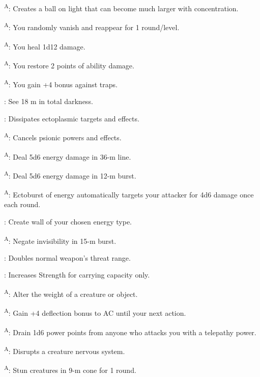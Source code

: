 \textsuperscript{A}: Creates a ball on light that can become much larger with concentration.

\textsuperscript{A}: You randomly vanish and reappear for 1 round/level.

\textsuperscript{A}: You heal 1d12 damage.

\textsuperscript{A}: You restore 2 points of ability damage.

\textsuperscript{A}: You gain +4 bonus against traps.

: See 18 m in total darkness.

: Dissipates ectoplasmic targets and effects.

\textsuperscript{A}: Cancels psionic powers and effects.

\textsuperscript{A}: Deal 5d6 energy damage in 36-m line.

\textsuperscript{A}: Deal 5d6 energy damage in 12-m burst.

\textsuperscript{A}: Ectoburst of energy automatically targets your attacker for 4d6 damage once each round.

: Create wall of your chosen energy type.

\textsuperscript{A}: Negate invisibility in 15-m burst.

: Doubles normal weapon's threat range.

: Increases Strength for carrying capacity only.

\textsuperscript{A}: Alter the weight of a creature or object.

\textsuperscript{A}: Gain +4 deflection bonus to AC until your next action.

\textsuperscript{A}: Drain 1d6 power points from anyone who attacks you with a telepathy power.

\textsuperscript{A}: Disrupts a creature nervous system.

\textsuperscript{A}: Stun creatures in 9-m cone for 1 round.

